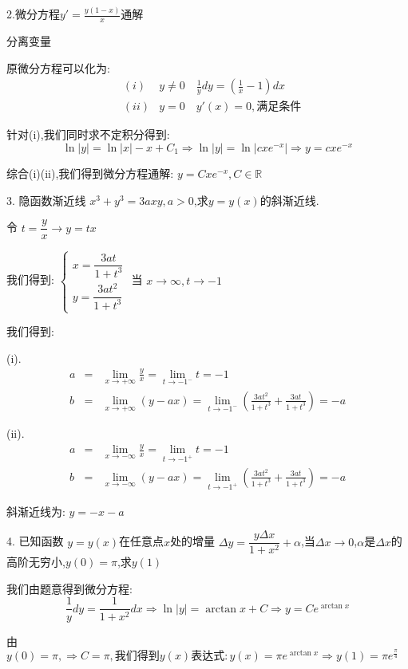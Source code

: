 
2.微分方程$y'=\frac{y(1-x)}{x}$通解
\begin{solution}
	
	分离变量
	
	原微分方程可以化为: 
	\begin{eqnarray*}
		&(i) &y\neq 0\quad\frac{1}{y}dy=(\frac{1}{x}-1)dx\\
		&(ii)&y=0\quad y'(x)=0,\text{满足条件}
	\end{eqnarray*}
	
	针对(i),我们同时求不定积分得到: 
	$$\ln|y|=\ln|x|-x+C_{1}\Rightarrow \ln|y|=\ln|cxe^{-x}|\Rightarrow y=cxe^{-x}$$
	
	综合(i)(ii),我们得到微分方程通解: $y=Cxe^{-x},C\in \mathbb{R}$
\end{solution}


3. 隐函数渐近线 $x^3+y^3=3axy,a>0$,求$y=y(x)$的斜渐近线.
\begin{solution}
	
	令 $t=\dfrac{y}{x}\rightarrow y=tx$
	
	我们得到: $\left\lbrace 
	\begin{array}{l}
		x=\dfrac{3at}{1+t^3}\\
		y=\dfrac{3at^2}{1+t^3}
	\end{array}
	\right. $
	当 $x\rightarrow \infty,t\rightarrow -1$
	
	我们得到: 
	
	(i).
	\begin{eqnarray*}
		a&=&\lim\limits_{x\rightarrow +\infty}\frac{y}{x}=\lim\limits_{t\rightarrow -1^{-} }t=-1\\
		b&=&\lim\limits_{x\rightarrow +\infty}(y-ax)=\lim\limits_{t\rightarrow -1^{-}}(\frac{3at^2}{1+t^3}+\frac{3at}{1+t^3})=-a
	\end{eqnarray*}
	
	(ii).
	\begin{eqnarray*}
		a&=&\lim\limits_{x\rightarrow -\infty}\frac{y}{x}=\lim\limits_{t\rightarrow -1^{+} }t=-1\\
		b&=&\lim\limits_{x\rightarrow -\infty}(y-ax)=\lim\limits_{t\rightarrow -1^{+}}(\frac{3at^2}{1+t^3}+\frac{3at}{1+t^3})=-a
	\end{eqnarray*}
	
	斜渐近线为: $y=-x-a$
\end{solution}


4. 已知函数 $y=y(x)$在任意点$x$处的增量 $\Delta y=\dfrac{y\Delta x}{1+x^2}+\alpha$,当$\Delta x\rightarrow 0$,$\alpha$是$\Delta x$的高阶无穷小,$y(0)=\pi$,求$y(1)$
\begin{solution}
	
	我们由题意得到微分方程: 
	$$\frac{1}{y}dy=\frac{1}{1+x^2}dx\Rightarrow \ln|y|=\arctan x+C\Rightarrow y=Ce^{\arctan x}$$
	
	由 $y(0)=\pi,\Rightarrow C=\pi,\text{我们得到}y(x)\text{表达式}: y(x)=\pi e^{\arctan x}\Rightarrow y(1)=\pi e^{\frac{\pi}{4}}$
\end{solution}


